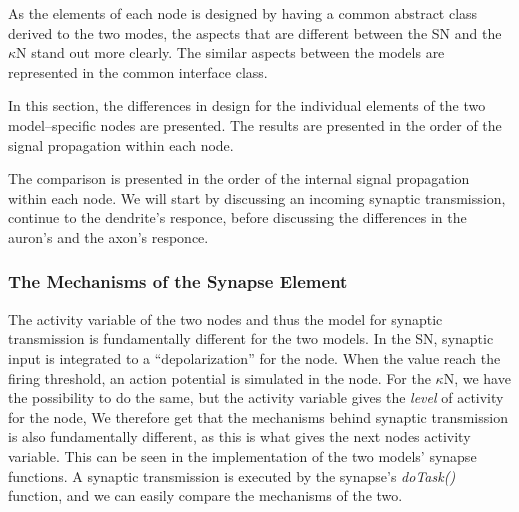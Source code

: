 	As the elements of each node is designed by having a common abstract class derived to the two modes, the aspects that are different between the SN and the $\kappa$N stand out more clearly.
	The similar aspects between the models are represented in the common interface class.

	In this section, the differences in design for the individual elements of the two model--specific nodes are presented. %
	The results are presented in the order of the signal propagation within each node.
	
	The comparison is presented in the order of the internal signal propagation within each node.
	We will start by discussing an incoming synaptic transmission, continue to the dendrite's responce, before discussing the differences in the auron's and the axon's responce.

		\subsubsection{The Mechanisms of the Synapse Element}
		The activity variable of the two nodes and thus the model for synaptic transmission is fundamentally different for the two models.
		In the SN, synaptic input is integrated to a ``depolarization'' for the node.
		When the value reach the firing threshold, an action potential is simulated in the node.
		For the $\kappa$N, we have the possibility to do the same, but the activity variable gives the \emph{level} of activity for the node, 
		We therefore get that the mechanisms behind synaptic transmission is also fundamentally different, as this is what gives the next nodes activity variable. %
		This can be seen in the implementation of the two models' synapse functions. 
		A synaptic transmission is executed by the synapse's \emph{doTask()} function, and we can easily compare the mechanisms of the two.

